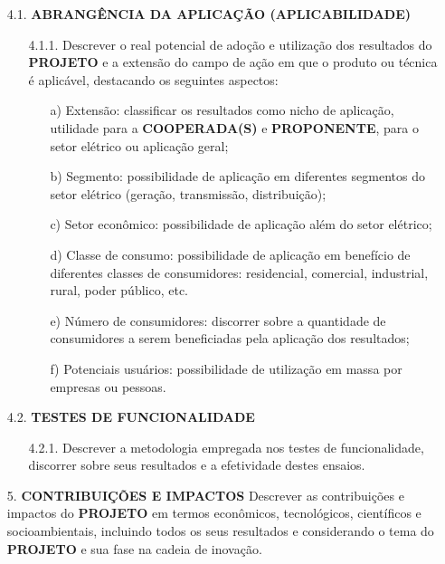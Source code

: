 {\begin{lmarginbox}
\begin{enumerate}[leftmargin=1cm, font=\bfseries]
        \item[4.1.]	\textbf{ABRANGÊNCIA DA APLICAÇÃO (APLICABILIDADE)}
            \begin{enumerate}[font=\bfseries]
                \item[4.1.1.] Descrever o real potencial de adoção e utilização dos resultados do \textbf{PROJETO} e a extensão do campo de ação em que o produto ou técnica é aplicável, destacando os seguintes aspectos:
                    \begin{enumerate}[font=\bfseries]
                        \item[a)] Extensão: classificar os resultados como nicho de aplicação, utilidade para a \textbf{COOPERADA(S)} e \textbf{PROPONENTE}, para o setor elétrico ou aplicação geral;
                        \item[b)] Segmento: possibilidade de aplicação em diferentes segmentos do setor elétrico (geração, transmissão, distribuição);
                        \item[c)] Setor econômico: possibilidade de aplicação além do setor elétrico;
                        \item[d)] Classe de consumo: possibilidade de aplicação em benefício de diferentes classes de consumidores: residencial, comercial, industrial, rural, poder público, etc.
                        \item[e)] Número de consumidores: discorrer sobre a quantidade de consumidores a serem beneficiadas pela aplicação dos resultados;
                        \item[f)] Potenciais usuários: possibilidade de utilização em massa por empresas ou pessoas.
                    \end{enumerate}
            \end{enumerate}
        \item[4.2.]	\textbf{TESTES DE FUNCIONALIDADE}
            \begin{enumerate}[font=\bfseries]
                \item[4.2.1.] Descrever a metodologia empregada nos testes de funcionalidade, discorrer sobre seus resultados e a efetividade destes ensaios.
            \end{enumerate}

        \item[5.] \textbf{CONTRIBUIÇÕES E IMPACTOS} Descrever as contribuições e impactos do \textbf{PROJETO} em termos econômicos, tecnológicos, científicos e socioambientais, incluindo todos os seus resultados e considerando o tema do \textbf{PROJETO} e sua fase na cadeia de inovação.


\end{enumerate}
\end{lmarginbox}}
